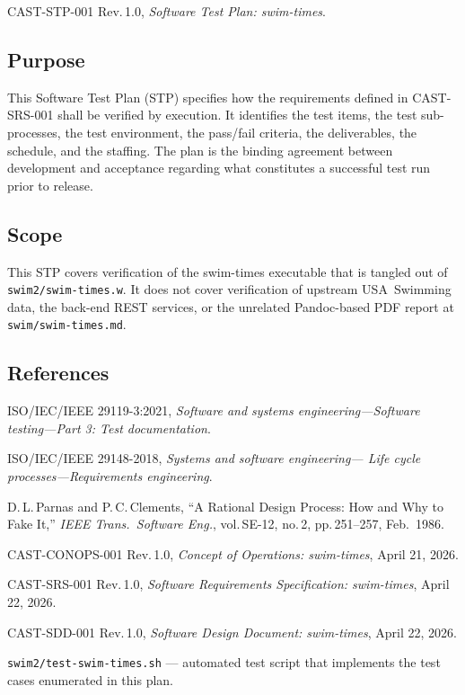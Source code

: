 \documentclass[12pt]{article}
\newcommand{\code}[1]{\texttt{#1}}
\begin{document}
CAST-STP-001 Rev.\,1.0, \textit{Software Test Plan: swim-times}.

\subsection{Purpose}

This Software Test Plan (STP) specifies how the requirements
defined in CAST-SRS-001 shall be verified by execution.  It
identifies the test items, the test sub-processes, the test
environment, the pass/fail criteria, the deliverables, the
schedule, and the staffing.  The plan is the binding agreement
between development and acceptance regarding what constitutes a
successful test run prior to release.

\subsection{Scope}

This STP covers verification of the swim-times executable that
is tangled out of \code{swim2/swim-times.w}.  It does not cover
verification of upstream USA~Swimming data, the back-end REST
services, or the unrelated Pandoc-based PDF report at
\code{swim/swim-times.md}.

\subsection{References}

\begin{enumerate}[label={[\arabic*]}]
  \item ISO/IEC/IEEE 29119-3:2021, \textit{Software and systems
        engineering---Software testing---Part 3: Test documentation}.
  \item ISO/IEC/IEEE 29148-2018, \textit{Systems and software engineering---
        Life cycle processes---Requirements engineering}.
  \item D.\,L.\,Parnas and P.\,C.\,Clements, ``A Rational Design Process:
        How and Why to Fake It,'' \textit{IEEE Trans.\ Software Eng.},
        vol.\,SE-12, no.\,2, pp.\,251--257, Feb.\ 1986.
  \item CAST-CONOPS-001 Rev.\,1.0, \textit{Concept of Operations:
        swim-times}, April 21, 2026.
  \item CAST-SRS-001 Rev.\,1.0, \textit{Software Requirements
        Specification: swim-times}, April 22, 2026.
  \item CAST-SDD-001 Rev.\,1.0, \textit{Software Design Document:
        swim-times}, April 22, 2026.
  \item \code{swim2/test-swim-times.sh} --- automated test script
        that implements the test cases enumerated in this plan.
\end{enumerate}
\end{document}

